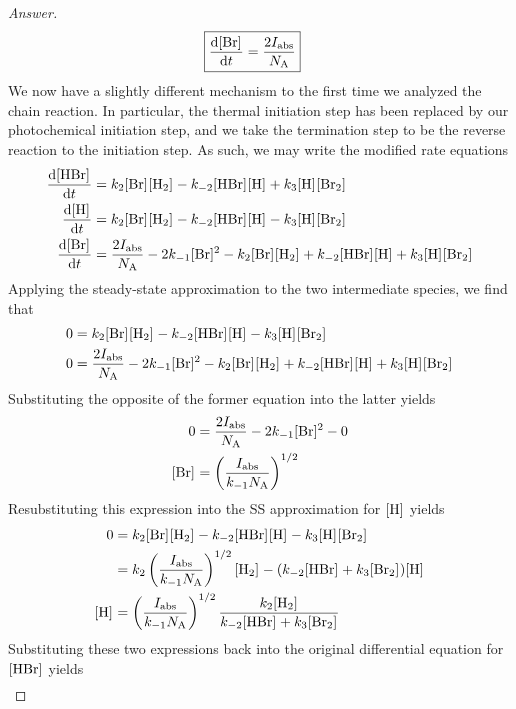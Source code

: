 \documentclass[../psets.tex]{subfiles}
\begin{document}
\begin{enumerate}[label={\textbf{29-\arabic*.}},leftmargin=3.5em]
\begin{proof}[Answer]
\begin{align*}
            \Aboxed{\dv{\cnc{Br}}{t} &= \frac{2I_\text{abs}}{\NA}}
        \end{align*}
        We now have a slightly different mechanism to the first time we analyzed the  chain reaction. In particular, the thermal initiation step has been replaced by our photochemical initiation step, and we take the termination step to be the reverse reaction to the initiation step. As such, we may write the modified rate equations
        \begin{align*}
            \dv{\cnc{HBr}}{t} &= k_2\cnc{Br}\cnc{H2}-k_{-2}\cnc{HBr}\cnc{H}+k_3\cnc{H}\cnc{Br2}\\
            \dv{\cnc{H}}{t} &= k_2\cnc{Br}\cnc{H2}-k_{-2}\cnc{HBr}\cnc{H}-k_3\cnc{H}\cnc{Br2}\\
            \dv{\cnc{Br}}{t} &= \frac{2I_\text{abs}}{\NA}-2k_{-1}\cnc{Br}^2-k_2\cnc{Br}\cnc{H2}+k_{-2}\cnc{HBr}\cnc{H}+k_3\cnc{H}\cnc{Br2}
        \end{align*}
        Applying the steady-state approximation to the two intermediate species, we find that
        \begin{align*}
            0 &= k_2\cnc{Br}\cnc{H2}-k_{-2}\cnc{HBr}\cnc{H}-k_3\cnc{H}\cnc{Br2}\\
            0 &= \frac{2I_\text{abs}}{\NA}-2k_{-1}\cnc{Br}^2-k_2\cnc{Br}\cnc{H2}+k_{-2}\cnc{HBr}\cnc{H}+k_3\cnc{H}\cnc{Br2}
        \end{align*}
        Substituting the opposite of the former equation into the latter yields
        \begin{align*}
            0 &= \frac{2I_\text{abs}}{\NA}-2k_{-1}\cnc{Br}^2-0\\
            \cnc{Br} &= \left( \frac{I_\text{abs}}{k_{-1}\NA} \right)^{1/2}
        \end{align*}
        Resubstituting this expression into the SS approximation for $\cnc{H}$ yields
        \begin{align*}
            0 &= k_2\cnc{Br}\cnc{H2}-k_{-2}\cnc{HBr}\cnc{H}-k_3\cnc{H}\cnc{Br2}\\
            &= k_2\left( \frac{I_\text{abs}}{k_{-1}\NA} \right)^{1/2}\cnc{H2}-(k_{-2}\cnc{HBr}+k_3\cnc{Br2})\cnc{H}\\
            \cnc{H} &= \left( \frac{I_\text{abs}}{k_{-1}\NA} \right)^{1/2}\frac{k_2\cnc{H2}}{k_{-2}\cnc{HBr}+k_3\cnc{Br2}}
        \end{align*}
        Substituting these two expressions back into the original differential equation for $\cnc{HBr}$ yields
        \begin{align*}

\end{align*}
\end{proof}
\end{enumerate}
\end{document}

